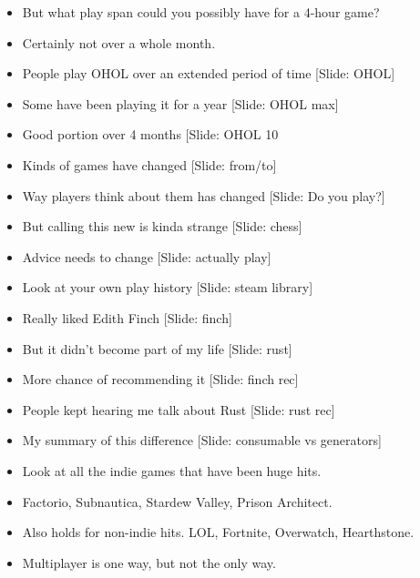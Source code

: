 \documentclass[12pt]{article}
\begin{document}
{\begin{itemize}
\item But what play span could you possibly have for a 4-hour game?

\item Certainly not over a whole month.

\item People play OHOL over an extended period of time [Slide: OHOL]

\item Some have been playing it for a year [Slide: OHOL max]

\item Good portion over 4 months [Slide: OHOL 10%

\item Kinds of games have changed [Slide: from/to]

\item Way players think about them has changed [Slide:  Do you play?]

\item But calling this new is kinda strange [Slide:  chess]

\item Advice needs to change [Slide: actually play]

\item Look at your own play history [Slide: steam library]

\item Really liked Edith Finch [Slide: finch]

\item But it didn't become part of my life [Slide: rust]

\item More chance of recommending it [Slide:  finch rec]

\item People kept hearing me talk about Rust [Slide:  rust rec]

\item My summary of this difference [Slide: consumable vs generators]

\item Look at all the indie games that have been huge hits.

\item Factorio, Subnautica, Stardew Valley, Prison Architect.

\item Also holds for non-indie hits.  LOL, Fortnite, Overwatch, Hearthstone.

\item Multiplayer is one way, but not the only way.


\end{itemize}}
\end{document}
